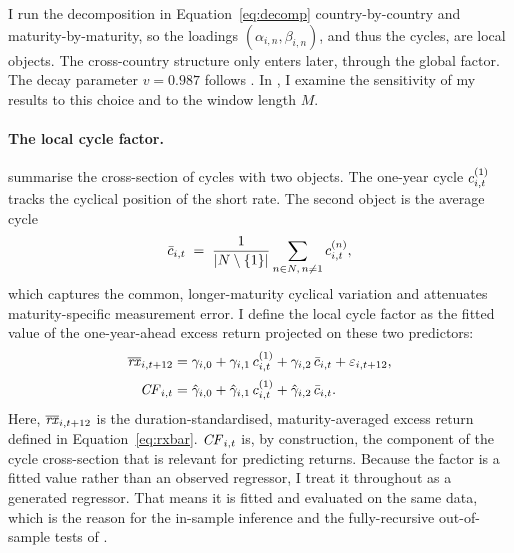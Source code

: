 I run the decomposition in Equation~\eqref{eq:decomp}
country-by-country and maturity-by-maturity, so the loadings
$(\alpha_{i,n},\beta_{i,n})$, and thus the cycles, are local objects. The
cross-country structure only enters later, through the global factor. The decay
parameter $v=0.987$ follows \citet{cieslak2015}. In , I
examine the sensitivity of my results to this choice and to the window length
$M$.

\paragraph{The local cycle factor.}
\citet{cieslak2015} summarise the cross-section of cycles with two objects.
The one-year cycle $c^{(1)}_{i,t}$ tracks the cyclical
position of the short rate. The second object is the average cycle
\begin{equation}
  \bar{c}_{i,t} \;=\; \frac{1}{|N\setminus\{1\}|}
                      \sum_{n\in N,\, n\neq 1}c^{(n)}_{i,t},
  \label{eq:cbar}
\end{equation}
which captures the common, longer-maturity cyclical variation and attenuates
maturity-specific measurement error. I define the local cycle factor as
the fitted value of the one-year-ahead excess return projected on these two
predictors:
\begin{align}
  \overline{\mathit{rx}}_{i,t+12} &= \gamma_{i,0} + \gamma_{i,1}\,c^{(1)}_{i,t}
                     + \gamma_{i,2}\,\bar{c}_{i,t} + \varepsilon_{i,t+12},
                     \label{eq:cf-reg}\\[2pt]
  \mathit{CF}_{i,t}       &= \hat\gamma_{i,0} + \hat\gamma_{i,1}\,c^{(1)}_{i,t}
                     + \hat\gamma_{i,2}\,\bar{c}_{i,t}.
                     \label{eq:cf}
\end{align}
Here, $\overline{\mathit{rx}}_{i,t+12}$ is the duration-standardised, maturity-averaged excess
return defined in Equation~\eqref{eq:rxbar}. $\mathit{CF}_{i,t}$ is, by construction, the component of the cycle
cross-section that is relevant for predicting returns. Because the factor is a
fitted value rather than an observed regressor, I treat it throughout as a
generated regressor. That means it is fitted and evaluated on the same data,
which is the reason for the in-sample inference and the fully-recursive
out-of-sample tests of .

